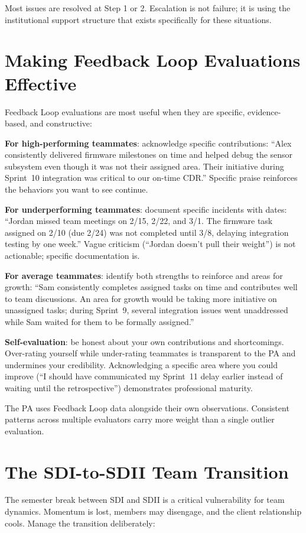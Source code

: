 Most issues are resolved at Step 1 or 2. Escalation is not failure; it is using the institutional support structure that exists specifically for these situations.



\section{Making Feedback Loop Evaluations Effective}
Feedback Loop evaluations are most useful when they are specific, evidence-based, and constructive:

\textbf{For high-performing teammates}: acknowledge specific contributions: ``Alex consistently delivered firmware milestones on time and helped debug the sensor subsystem even though it was not their assigned area. Their initiative during Sprint~10 integration was critical to our on-time CDR.'' Specific praise reinforces the behaviors you want to see continue.

\textbf{For underperforming teammates}: document specific incidents with dates: ``Jordan missed team meetings on 2/15, 2/22, and 3/1. The firmware task assigned on 2/10 (due 2/24) was not completed until 3/8, delaying integration testing by one week.'' Vague criticism (``Jordan doesn't pull their weight'') is not actionable; specific documentation is.

\textbf{For average teammates}: identify both strengths to reinforce and areas for growth: ``Sam consistently completes assigned tasks on time and contributes well to team discussions. An area for growth would be taking more initiative on unassigned tasks; during Sprint~9, several integration issues went unaddressed while Sam waited for them to be formally assigned.''

\textbf{Self-evaluation}: be honest about your own contributions and shortcomings. Over-rating yourself while under-rating teammates is transparent to the PA and undermines your credibility. Acknowledging a specific area where you could improve (``I should have communicated my Sprint~11 delay earlier instead of waiting until the retrospective'') demonstrates professional maturity.

The PA uses Feedback Loop data alongside their own observations. Consistent patterns across multiple evaluators carry more weight than a single outlier evaluation.



\section{The SDI-to-SDII Team Transition}
The semester break between SDI and SDII is a critical vulnerability for team dynamics. Momentum is lost, members may disengage, and the client relationship cools. Manage the transition deliberately:

